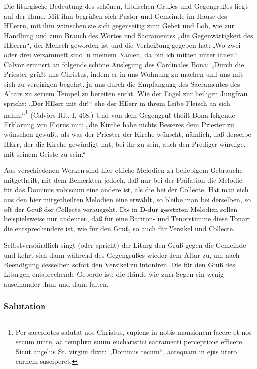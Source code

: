 Die liturgische Bedeutung des schönen, biblischen Grußes und Gegengrußes liegt auf der Hand. Mit ihm begrüßen sich Pastor und Gemeinde im Hause des HEerrn, mit ihm wünschen sie sich gegenseitig zum Gebet und Lob, wie zur Handlung und zum Brauch des Wortes und Sacramentes „die Gegenwärtigkeit des HEerrn“, der Mensch geworden ist und die Verheißung gegeben hat: „Wo zwei oder drei versammelt sind in meinem Namen, da bin ich mitten unter ihnen.“ Calvör erinnert an folgende schöne Auslegung des Cardinales Bona: „Durch die Priester grüßt uns Christus, indem er in uns Wohnung zu machen und uns mit sich zu vereinigen begehrt, ja uns durch die Empfangung des Sacramentes des Altars zu seinem Tempel zu bereiten sucht. Wie der Engel zur heiligen Jungfrau spricht: „Der HEerr mit dir!“ ehe der HEerr in ihrem
Leibe Fleisch an sich nahm.“\footnote{Per sacerdotes salutat nos Christus, cupiens in nobis mansionem facere et nos secum unire, ac templum suum eucharistici sacramenti perceptione efficere. Sicut angelus St. virgini dixit: „Dominus tecum“, antequam in ejus utero carnem susciperet.} (Calvörs Rit. I, 468.) Und von dem Gegengruß theilt Bona folgende Erklärung von Florus mit: „die Kirche habe nichts Besseres dem Priester zu wünschen gewußt, als was der Priester der Kirche wünscht, nämlich, daß derselbe HErr, der die Kirche gewürdigt hat, bei ihr zu sein, auch den Prediger würdige, mit seinem Geiste zu sein.“

Aus verschiedenen Werken sind hier etliche Melodien zu beliebigem Gebrauche mitgetheilt, mit dem Bemerkten jedoch, daß nur bei der Präfation die Melodie für das Dominus vobiscum eine andere ist, als die bei der Collecte. Hat man sich aus den hier mitgetheilten Melodien eine erwählt, so bleibe man bei derselben, so oft der Gruß der Collecte vorausgeht. Die in D-dur gesetzten Melodien sollen beispielsweise nur andeuten, daß für eine Bariton- und Tenorstimme diese Tonart die entsprechendere ist, wie für den Gruß, so auch für Versikel und Collecte.

Selbstverständlich singt (oder spricht) der Liturg den Gruß gegen die Gemeinde und kehrt sich dann während des Gegengrußes wieder dem Altar zu, um nach Beendigung desselben sofort den Versikel zu intoniren. Die für den Gruß des Liturgen entsprechende Geberde ist: die Hände wie zum Segen ein wenig auseinander thun und dann falten.

\subsubsection{Salutation}

